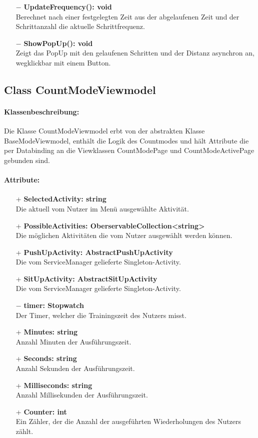 \documentclass[a4paper,12pt]{article}
\begin{document}
\begin{itemize}
	\item[$-$] \textbf{UpdateFrequency(): void} \\ Berechnet nach einer festgelegten Zeit aus der abgelaufenen Zeit und der Schrittanzahl die aktuelle Schrittfrequenz.
	\item[$-$] \textbf{ShowPopUp(): void} \\ Zeigt das PopUp mit den gelaufenen Schritten und der Distanz asynchron an, wegklickbar mit einem Button.
\end{itemize}

\subsection{Class CountModeViewmodel}
\paragraph{Klassenbeschreibung:}
Die Klasse CountModeViewmodel erbt von der abstrakten Klasse BaseModeViewmodel, enthält die Logik des Countmodes und hält Attribute die per Databinding an die Viewklassen CountModePage und CountModeActivePage gebunden sind.
\paragraph{Attribute:}
\begin{itemize}
	\item[+] \textbf{SelectedActivity: string} \\ Die aktuell vom Nutzer im Menü ausgewählte Aktivität. 
	\item[+] \textbf{PossibleActivities: OberservableCollection<string>} \\ Die möglichen Aktivitäten die vom Nutzer ausgewählt werden können. 
	\item[+] \textbf{PushUpActivity: AbstractPushUpActivity} \\ Die vom ServiceManager gelieferte Singleton-Activity.
	\item[+] \textbf{SitUpActivity: AbstractSitUpActivity} \\ Die vom ServiceManager gelieferte Singleton-Activity.
	\item[$-$] \textbf{timer: Stopwatch} \\ Der Timer, welcher die Trainingszeit des Nutzers misst. 
	\item[+] \textbf{Minutes: string} \\ Anzahl Minuten der Ausführungszeit. 
	\item[+] \textbf{Seconds: string} \\ Anzahl Sekunden der Ausführungszeit. 
	\item[+] \textbf{Milliseconds: string} \\ Anzahl Millisekunden der Ausführungszeit. 
	\item[+] \textbf{Counter: int} \\ Ein Zähler, der die Anzahl der ausgeführten Wiederholungen des Nutzers zählt. 
\end{itemize}
\end{document}
